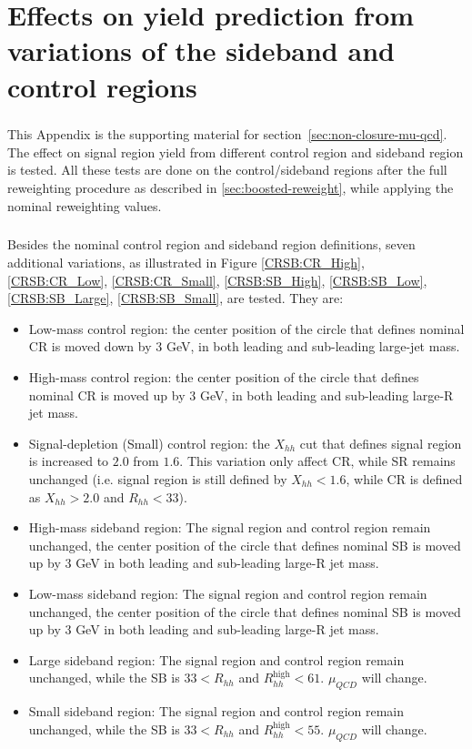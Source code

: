 \chapter{Effects on yield prediction from variations of the sideband and control regions}
\label{app:appendixSysVar}

\paragraph{}
This Appendix is the supporting material for section~\ref{sec:non-closure-mu-qcd}. 
The effect on signal region yield from different control region and sideband region is tested. 
All these tests are done on the control/sideband regions after the full reweighting procedure as described in \ref{sec:boosted-reweight}, while applying the nominal reweighting values.

\paragraph{}
Besides the nominal control region and sideband region definitions, seven additional variations, as illustrated in Figure \ref{CRSB:CR_High}, \ref{CRSB:CR_Low}, \ref{CRSB:CR_Small}, \ref{CRSB:SB_High}, \ref{CRSB:SB_Low}, \ref{CRSB:SB_Large}, \ref{CRSB:SB_Small}, are tested. 
They are:
\begin{itemize}
	\item Low-mass control region: the center position of the circle that defines nominal CR is moved down by 3 GeV, in both leading and sub-leading large-jet mass.
	\item High-mass control region: the center position of the circle that defines nominal CR is moved up by 3 GeV, in both leading and sub-leading large-R jet mass.
	\item Signal-depletion (Small) control region: the $X_{hh}$ cut that defines signal region is increased to $2.0$ from $1.6$. This variation only affect CR, while SR remains unchanged (i.e. signal region is still defined by $X_{hh}<1.6$, while CR is defined as $X_{hh}>2.0$ and $R_{hh}<33$).
	\item High-mass sideband region: The signal region and control region remain unchanged, the center position of the circle that defines nominal SB is moved up by 3 GeV in both leading and sub-leading large-R jet mass.
	\item Low-mass sideband region: The signal region and control region remain unchanged, the center position of the circle that defines nominal SB is moved up by 3 GeV in both leading and sub-leading large-R jet mass.
	\item Large sideband region: The signal region and control region remain unchanged, while the SB is $33 < R_{hh}$ and $ R_{hh}^{\text{high}} < 61$. $\mu_{QCD}$ will change.
	\item Small sideband region: The signal region and control region remain unchanged, while the SB is $33 < R_{hh}$ and $ R_{hh}^{\text{high}} < 55$. $\mu_{QCD}$ will change.
\end{itemize}

